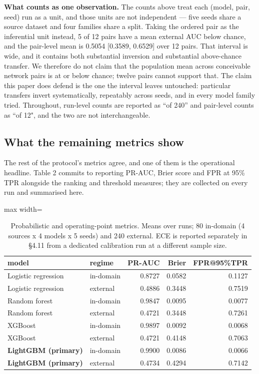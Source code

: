 \documentclass[preprint,12pt]{elsarticle}
\begin{document}
\textbf{What counts as one observation.} The counts above treat each (model, pair, seed) run as a unit, and those units are not independent --- five seeds share a source dataset and four families share a split. Taking the ordered pair as the inferential unit instead, 5 of 12 pairs have a mean external AUC below chance, and the pair-level mean is 0.5054 [0.3589, 0.6529] over 12 pairs. That interval is wide, and it contains both substantial inversion and substantial above-chance transfer. We therefore do not claim that the population mean across conceivable network pairs is at or below chance; twelve pairs cannot support that. The claim this paper does defend is the one the interval leaves untouched: particular transfers invert systematically, repeatably across seeds, and in every model family tried. Throughout, run-level counts are reported as ``of 240'' and pair-level counts as ``of 12", and the two are not interchangeable.

\subsection{What the remaining metrics show}

The rest of the protocol's metrics agree, and one of them is the operational headline. Table 2 commits to reporting PR-AUC, Brier score and FPR at 95\% TPR alongside the ranking and threshold measures; they are collected on every run and summarised here.

\begin{table}[htbp]\centering\scriptsize
\caption{Probabilistic and operating-point metrics. Means over runs; 80 in-domain (4 sources x 4 models x 5 seeds) and 240 external. ECE is reported separately in \S{}4.11 from a dedicated calibration run at a different sample size.}
\begin{adjustbox}{max width=\textwidth}\begin{tabular}{llrrr}
\toprule
model & regime & PR-AUC & Brier & FPR@95\%TPR \\
\midrule
Logistic regression & in-domain & 0.8727 & 0.0582 & 0.1127 \\
Logistic regression & external & 0.4886 & 0.3448 & 0.7519 \\
Random forest & in-domain & 0.9847 & 0.0095 & 0.0077 \\
Random forest & external & 0.4721 & 0.3448 & 0.7261 \\
XGBoost & in-domain & 0.9897 & 0.0092 & 0.0068 \\
XGBoost & external & 0.4721 & 0.4148 & 0.7063 \\
\textbf{LightGBM (primary)} & in-domain & 0.9900 & 0.0086 & 0.0066 \\
\textbf{LightGBM (primary)} & external & 0.4734 & 0.4294 & 0.7142 \\
\bottomrule
\end{tabular}\end{adjustbox}
\end{table}
\end{document}
